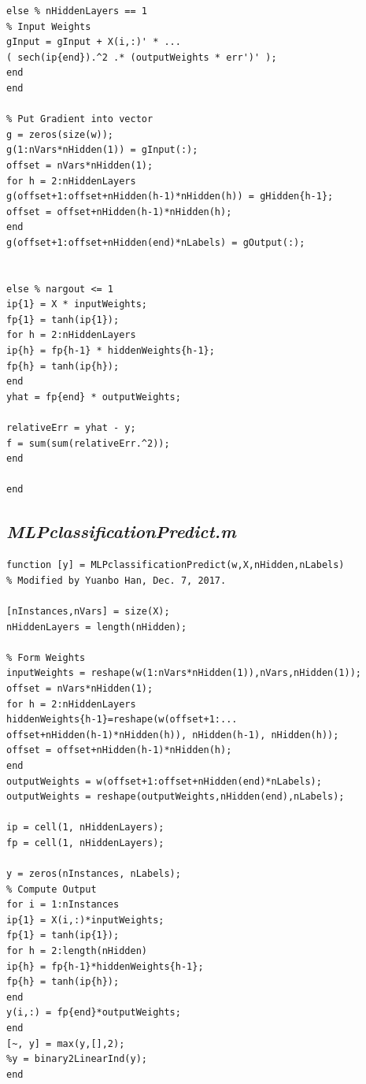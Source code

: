 \documentclass{article}
\begin{document}
\begin{lstlisting}
else % nHiddenLayers == 1
% Input Weights
gInput = gInput + X(i,:)' * ...
( sech(ip{end}).^2 .* (outputWeights * err')' );
end
end

% Put Gradient into vector
g = zeros(size(w));
g(1:nVars*nHidden(1)) = gInput(:);
offset = nVars*nHidden(1);
for h = 2:nHiddenLayers
g(offset+1:offset+nHidden(h-1)*nHidden(h)) = gHidden{h-1};
offset = offset+nHidden(h-1)*nHidden(h);
end
g(offset+1:offset+nHidden(end)*nLabels) = gOutput(:);


else % nargout <= 1
ip{1} = X * inputWeights;
fp{1} = tanh(ip{1});
for h = 2:nHiddenLayers
ip{h} = fp{h-1} * hiddenWeights{h-1};
fp{h} = tanh(ip{h});
end
yhat = fp{end} * outputWeights;

relativeErr = yhat - y;
f = sum(sum(relativeErr.^2));
end

end
\end{lstlisting}

\subsection{\emph{MLPclassificationPredict.m}}
\begin{lstlisting}
function [y] = MLPclassificationPredict(w,X,nHidden,nLabels)
% Modified by Yuanbo Han, Dec. 7, 2017.

[nInstances,nVars] = size(X);
nHiddenLayers = length(nHidden);

% Form Weights
inputWeights = reshape(w(1:nVars*nHidden(1)),nVars,nHidden(1));
offset = nVars*nHidden(1);
for h = 2:nHiddenLayers
hiddenWeights{h-1}=reshape(w(offset+1:...
offset+nHidden(h-1)*nHidden(h)), nHidden(h-1), nHidden(h));
offset = offset+nHidden(h-1)*nHidden(h);
end
outputWeights = w(offset+1:offset+nHidden(end)*nLabels);
outputWeights = reshape(outputWeights,nHidden(end),nLabels);

ip = cell(1, nHiddenLayers);
fp = cell(1, nHiddenLayers);

y = zeros(nInstances, nLabels);
% Compute Output
for i = 1:nInstances
ip{1} = X(i,:)*inputWeights;
fp{1} = tanh(ip{1});
for h = 2:length(nHidden)
ip{h} = fp{h-1}*hiddenWeights{h-1};
fp{h} = tanh(ip{h});
end
y(i,:) = fp{end}*outputWeights;
end
[~, y] = max(y,[],2);
%y = binary2LinearInd(y);
end
\end{lstlisting}
\end{document}
